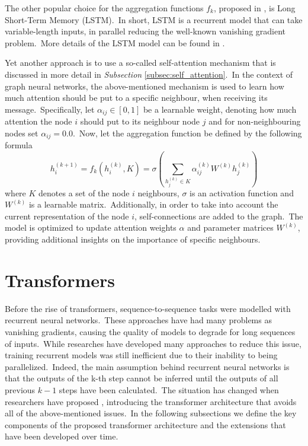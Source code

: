 \documentclass[longabstract, english, mgr]{iithesis}
\theoremstyle{default_theorem_style}\newtheorem{theorem}{Theorem}
\theoremstyle{default_theorem_style}\newtheorem{definition}{Definition}
\begin{document}
\noindent The other popular choice for the aggregation functions $f_k$, proposed in \cite{graphsage}, is
Long Short-Term Memory (LSTM).\ In short, LSTM is a recurrent model that can take variable-length
inputs, in parallel reducing the well-known vanishing gradient problem.\ More details of the LSTM model can be found
in \cite{goodfellow_book}.\newline

\noindent Yet another approach is to use a so-called self-attention mechanism that is discussed in more detail in
\textit{Subsection} \ref{subsec:self_attention}.\ In the context of graph neural networks, the above-mentioned
mechanism is used to learn how much attention should be put to a specific neighbour, when receiving its
message.\ Specifically, let $\alpha_{ij} \in [0, 1]$ be a learnable weight, denoting how much attention the node
$i$ should put to its neighbour node $j$ and for non-neighbouring nodes set $\alpha_{ij} = 0.0$.\ Now, let the
aggregation function be defined by the following formula
$$
h_i^{(k + 1)} = f_k(h_i^{(k)}, K) = \sigma(\sum_{h_j^{(k)} \in K} \alpha_{ij}^{(k)} W^{(k)} h_j^{(k)})
$$
where $K$ denotes a set of the node $i$ neighbours, $\sigma$ is an activation function and $W^{(k)}$ is a learnable
matrix.\ Additionally, in order to take into account the current representation of the node $i$, self-connections
are added to the graph.\ The model is optimized to update attention weights $\alpha$ and parameter matrices
$W^{(k)}$, providing additional insights on the importance of specific neighbours.\newline

\section{Transformers}\label{sec:transformers}

Before the rise of transformers, sequence-to-sequence tasks were modelled with recurrent neural
networks.\ These approaches have had many problems as vanishing gradients, causing the quality of models to degrade
for long sequences of inputs.\ While researches have developed many approaches to reduce this issue, training recurrent
models was still inefficient due to their inability to being parallelized.\ Indeed, the main assumption behind
recurrent neural networks is that the outputs of the k-th step cannot be inferred until the outputs of all previous
$k - 1$ steps have been calculated.\ The situation has changed when researchers have proposed
\cite{transformer_model}, introducing the transformer architecture that avoids all of the above-mentioned
issues.\ In the following subsections we define the key components of the proposed transformer architecture and the
extensions that have been developed over time.
\end{document}
